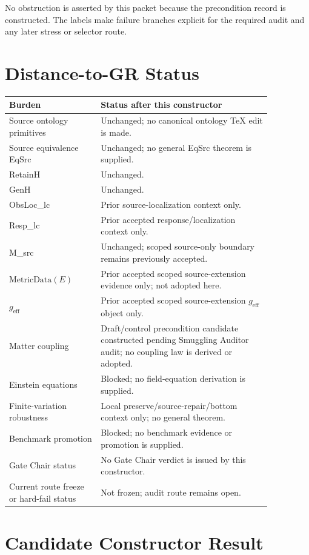 \documentclass[11pt]{article}
\newcommand{\geff}{g_{\mathrm{eff}}}
\begin{document}
No obstruction is asserted by this packet because the precondition record is
constructed. The labels make failure branches explicit for the required audit
and any later stress or selector route.

\section{Distance-to-GR Status}

\begin{longtable}{p{0.30\linewidth}p{0.56\linewidth}}
\toprule
Burden & Status after this constructor \\
\midrule
Source ontology primitives & Unchanged; no canonical ontology TeX edit is made. \\
Source equivalence EqSrc & Unchanged; no general EqSrc theorem is supplied. \\
RetainH & Unchanged. \\
GenH & Unchanged. \\
ObsLoc\_lc & Prior source-localization context only. \\
Resp\_lc & Prior accepted response/localization context only. \\
M\_src & Unchanged; scoped source-only boundary remains previously accepted. \\
\(\mathrm{MetricData}(E)\) & Prior accepted scoped source-extension evidence only; not adopted here. \\
\(\geff\) & Prior accepted scoped source-extension \(\geff\) object only. \\
Matter coupling & Draft/control precondition candidate constructed pending Smuggling Auditor audit; no coupling law is derived or adopted. \\
Einstein equations & Blocked; no field-equation derivation is supplied. \\
Finite-variation robustness & Local preserve/source-repair/bottom context only; no general theorem. \\
Benchmark promotion & Blocked; no benchmark evidence or promotion is supplied. \\
Gate Chair status & No Gate Chair verdict is issued by this constructor. \\
Current route freeze or hard-fail status & Not frozen; audit route remains open. \\
\bottomrule
\end{longtable}

\section{Candidate Constructor Result}
\end{document}
